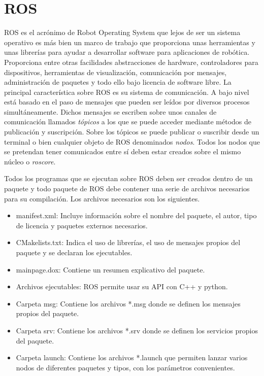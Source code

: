 \documentclass[12pt,a4paper,final,twoside]{book}
\begin{document}
\section{ROS}
\label{ros}
ROS es el acrónimo de Robot Operating System que lejos de ser un sistema operativo es más bien un marco de trabajo que proporciona unas herramientas y unas librerías para ayudar a desarrollar software para aplicaciones de robótica. Proporciona entre otras facilidades abstracciones de hardware, controladores para dispositivos, herramientas de visualización, comunicación por mensajes, administración de paquetes y todo ello bajo licencia de software libre.
La principal característica sobre ROS es su sistema de comunicación. A bajo nivel está basado en el paso de mensajes que pueden ser leídos por diversos procesos simultáneamente. Dichos mensajes se escriben sobre unos canales de comunicación llamados \textit{tópicos} a los que se puede acceder mediante métodos de publicación y suscripción. Sobre los tópicos se puede publicar o suscribir desde un terminal o bien cualquier objeto de ROS denominados \textit{nodos}. Todos los nodos que se pretendan tener comunicados entre sí deben estar creados sobre el mismo núcleo o \textit{roscore}.


Todos los programas que se ejecutan sobre ROS deben ser creados dentro de un paquete y todo paquete de ROS debe contener una serie de archivos necesarios para su compilación. Los archivos necesarios son los siguientes.
\begin{itemize}
\item manifest.xml: Incluye información sobre el nombre del paquete, el autor, tipo de licencia y paquetes externos necesarios.
\item CMakelists.txt: Indica el uso de librerías, el uso de mensajes propios del paquete y se declaran los ejecutables.
\item mainpage.dox: Contiene un resumen explicativo del paquete.
\item Archivos ejecutables: ROS permite usar su API con C++ y python.
\item Carpeta msg: Contiene los archivos *.msg donde se definen los mensajes propios del paquete.
\item Carpeta srv: Contiene los archivos *.srv donde se definen los servicios propios del paquete.
\item Carpeta launch: Contiene los archivos *.launch que permiten lanzar varios nodos de diferentes paquetes y tipos, con los parámetros convenientes.

\end{itemize}
\end{document}
